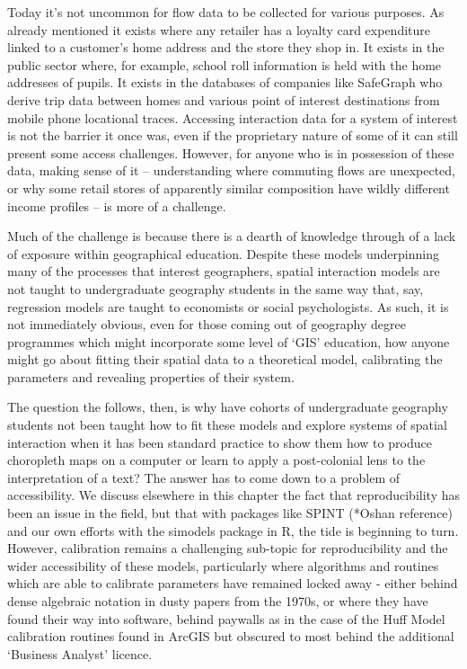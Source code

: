 \documentclass[11pt,letterpaper]{article}
\begin{document}
Today it's not uncommon for flow data to be collected for various purposes.
As already mentioned it exists where any retailer has a loyalty card expenditure linked to a customer's home address and the store they shop in.
It exists in the public sector where, for example, school roll information is held with the home addresses of pupils.
It exists in the databases of companies like SafeGraph who derive trip data between homes and various point of interest destinations from mobile phone locational traces.
Accessing interaction data for a system of interest is not the barrier it once was, even if the proprietary nature of some of it can still present some access challenges.
However, for anyone who is in possession of these data, making sense of it -- understanding where commuting flows are unexpected, or why some retail stores of apparently similar composition have wildly different income profiles -- is more of a challenge.

Much of the challenge is because there is a dearth of knowledge through of a lack of exposure within geographical education.
Despite these models underpinning many of the processes that interest geographers, spatial interaction models are not taught to undergraduate geography students in the same way that, say, regression models are taught to economists or social psychologists.
As such, it is not immediately obvious, even for those coming out of geography degree programmes which might incorporate some level of `GIS' education, how anyone might go about fitting their spatial data to a theoretical model, calibrating the parameters and revealing properties of their system.

The question the follows, then, is why have cohorts of undergraduate geography students not been taught how to fit these models and explore systems of spatial interaction when it has been standard practice to show them how to produce choropleth maps on a computer or learn to apply a post-colonial lens to the interpretation of a text?
The answer has to come down to a problem of accessibility.
We discuss elsewhere in this chapter the fact that reproducibility has been an issue in the field, but that with packages like SPINT (*Oshan reference) and our own efforts with the simodels package in R, the tide is beginning to turn.
However, calibration remains a challenging sub-topic for reproducibility and the wider accessibility of these models, particularly where algorithms and routines which are able to calibrate parameters have remained locked away - either behind dense algebraic notation in dusty papers from the 1970s, or where they have found their way into software, behind paywalls as in the case of the Huff Model calibration routines found in ArcGIS but obscured to most behind the additional `Business Analyst' licence.
\end{document}
